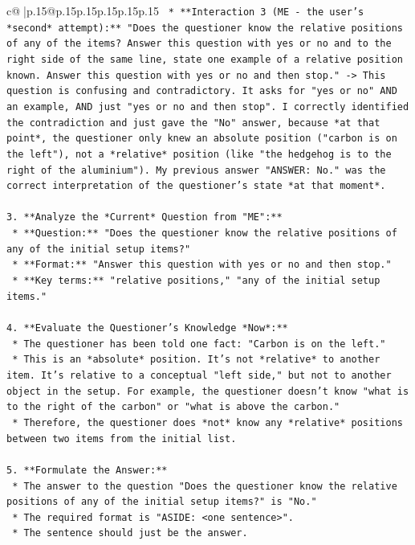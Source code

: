 \documentclass{article}
\begin{document}
{\begin{supertabular}{c@{$\;$}|p{.15\linewidth}@{}p{.15\linewidth}p{.15\linewidth}p{.15\linewidth}p{.15\linewidth}p{.15\linewidth}}
{{{\texttt{    *   **Interaction 3 (ME {-} the user's *second* attempt):** "Does the questioner know the relative positions of any of the items? Answer this question with yes or no and to the right side of the same line, state one example of a relative position known. Answer this question with yes or no and then stop." {-}> This question is confusing and contradictory. It asks for "yes or no" AND an example, AND just "yes or no and then stop". I correctly identified the contradiction and just gave the "No" answer, because *at that point*, the questioner only knew an absolute position ("carbon is on the left"), not a *relative* position (like "the hedgehog is to the right of the aluminium"). My previous answer "ANSWER: No." was the correct interpretation of the questioner's state *at that moment*.} \\
\\ 
\texttt{3.  **Analyze the *Current* Question from "ME":**} \\
\texttt{    *   **Question:** "Does the questioner know the relative positions of any of the initial setup items?"} \\
\texttt{    *   **Format:** "Answer this question with yes or no and then stop."} \\
\texttt{    *   **Key terms:** "relative positions," "any of the initial setup items."} \\
\\ 
\texttt{4.  **Evaluate the Questioner's Knowledge *Now*:**} \\
\texttt{    *   The questioner has been told one fact: "Carbon is on the left."} \\
\texttt{    *   This is an *absolute* position. It's not *relative* to another item. It's relative to a conceptual "left side," but not to another object in the setup. For example, the questioner doesn't know "what is to the right of the carbon" or "what is above the carbon."} \\
\texttt{    *   Therefore, the questioner does *not* know any *relative* positions between two items from the initial list.} \\
\\ 
\texttt{5.  **Formulate the Answer:**} \\
\texttt{    *   The answer to the question "Does the questioner know the relative positions of any of the initial setup items?" is "No."} \\
\texttt{    *   The required format is "ASIDE: <one sentence>".} \\
\texttt{    *   The sentence should just be the answer.} \\
}}}
\end{supertabular}}
\end{document}
